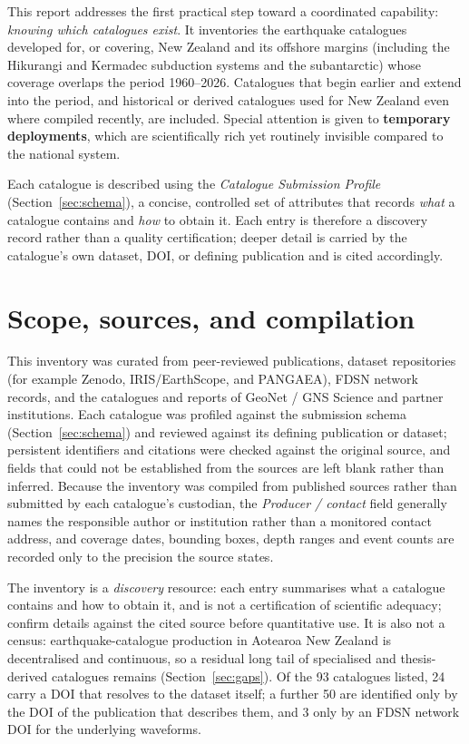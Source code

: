\documentclass[10pt,a4paper]{article}
\begin{document}
This report addresses the first practical step toward a coordinated capability: \emph{knowing which catalogues exist}. It inventories the earthquake catalogues developed for, or covering, New Zealand and its offshore margins (including the Hikurangi and Kermadec subduction systems and the subantarctic) whose coverage overlaps the period 1960--2026. Catalogues that begin earlier and extend into the period, and historical or derived catalogues used for New Zealand even where compiled recently, are included. Special attention is given to \textbf{temporary deployments}, which are scientifically rich yet routinely invisible compared to the national system.

Each catalogue is described using the \emph{Catalogue Submission Profile} (Section~\ref{sec:schema}), a concise, controlled set of attributes that records \emph{what} a catalogue contains and \emph{how} to obtain it. Each entry is therefore a discovery record rather than a quality certification; deeper detail is carried by the catalogue's own dataset, DOI, or defining publication and is cited accordingly.

\section{Scope, sources, and compilation}\label{sec:methods}
This inventory was curated from peer-reviewed publications, dataset repositories (for example Zenodo, IRIS/EarthScope, and PANGAEA), FDSN network records, and the catalogues and reports of GeoNet / GNS Science and partner institutions. Each catalogue was profiled against the submission schema (Section~\ref{sec:schema}) and reviewed against its defining publication or dataset; persistent identifiers and citations were checked against the original source, and fields that could not be established from the sources are left blank rather than inferred. Because the inventory was compiled from published sources rather than submitted by each catalogue's custodian, the \emph{Producer / contact} field generally names the responsible author or institution rather than a monitored contact address, and coverage dates, bounding boxes, depth ranges and event counts are recorded only to the precision the source states.

The inventory is a \emph{discovery} resource: each entry summarises what a catalogue contains and how to obtain it, and is not a certification of scientific adequacy; confirm details against the cited source before quantitative use. It is also not a census: earthquake-catalogue production in Aotearoa New Zealand is decentralised and continuous, so a residual long tail of specialised and thesis-derived catalogues remains (Section~\ref{sec:gaps}). Of the 93 catalogues listed, 24 carry a DOI that resolves to the dataset itself; a further 50 are identified only by the DOI of the publication that describes them, and 3 only by an FDSN network DOI for the underlying waveforms.
\end{document}
